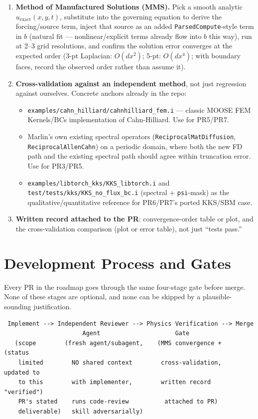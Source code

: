 \documentclass[11pt]{article}
\newenvironment{schematic}{%
  \begin{tcolorbox}[breakable, colback=codebg, colframe=gray!40, boxrule=0.4pt, arc=1mm, left=4mm, right=4mm, top=2mm, bottom=2mm]
  \ttfamily\footnotesize
}{%
  \end{tcolorbox}
}
\begin{document}
\begin{enumerate}[leftmargin=*]
\item \textbf{Method of Manufactured Solutions (MMS).} Pick a smooth
analytic $u_{\text{exact}}(x,y,t)$, substitute into the governing equation
to derive the forcing/source term, inject that source as an added
\texttt{ParsedCompute}-style term in $b$ (natural fit --- nonlinear/explicit
terms already flow into $b$ this way), run at 2--3 grid resolutions, and
confirm the solution error converges at the expected order (3-pt Laplacian:
$O(dx^2)$; 5-pt: $O(dx^4)$; with boundary faces, record the observed order
rather than assume it).
\item \textbf{Cross-validation against an independent method}, not just
regression against ourselves. Concrete anchors already in the repo:
\begin{itemize}
\item \texttt{examples/cahn\_hilliard/cahnhilliard\_fem.i} --- classic MOOSE
FEM Kernels/BCs implementation of Cahn-Hilliard. Use for PR5/PR7.
\item Marlin's own existing spectral operators
(\texttt{ReciprocalMatDiffusion}, \texttt{ReciprocalAllenCahn}) on a
periodic domain, where both the new FD path and the existing spectral path
should agree within truncation error. Use for PR3/PR5.
\item \texttt{examples/libtorch\_kks/KKS\_libtorch.i} and
\texttt{test/tests/kks/KKS\_no\_flux\_bc.i} (spectral + \texttt{psi}-mask) as
the qualitative/quantitative reference for PR6/PR7's ported KKS/SBM case.
\end{itemize}
\item \textbf{Written record attached to the PR}: convergence-order table or
plot, and the cross-validation comparison (plot or error table), not just
``tests pass.''
\end{enumerate}

\section{Development Process and Gates}
\label{sec:gates}

Every PR in the roadmap goes through the same four-stage gate before merge.
None of these stages are optional, and none can be skipped by a
plausible-sounding justification.

\begin{schematic}
\begin{verbatim}
 Implement --> Independent Reviewer --> Physics Verification --> Merge
                      Agent                     Gate
   (scope        (fresh agent/subagent,    (MMS convergence +     (status
    limited        NO shared context        cross-validation,     updated to
    to this        with implementer,        written record         "verified")
    PR's stated    runs code-review          attached to PR)
    deliverable)   skill adversarially)
\end{verbatim}
\end{schematic}
\end{document}
